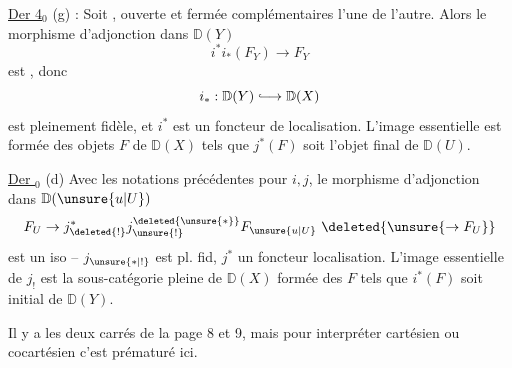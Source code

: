 \uline{Der 4}$_0$ (g) : Soit
,  ouverte et fermée complémentaires l'une de l'autre. Alors le morphisme d'adjonction dans $\mathbb D(Y)$
\[
 i^*i_*(F_Y)\longrightarrow F_Y
\]
est  , donc 
\[
 i_*:\mathbb D(Y)\lhook\joinrel\longrightarrow\mathbb D(X)
\]
est pleinement fidèle, et $i^*$ est un foncteur de localisation.  L'image essentielle  est formée des objets $F$ de $\mathbb D(X)$ tels que $j^*(F)$ soit l'objet final de $\mathbb D(U)$.

\uline{Der }$_0$ (d) Avec les notations précédentes pour $i,j$, le morphisme d'adjonction dans $\mathbb D(\unsure{u|U})$
\[
 F_U\to j_{\deleted{!}}^*j_{\unsure{!}}^{\deleted{\unsure{*}}}F_{\unsure{u|U}}\ \deleted{\unsure{\to F_U}}
\]
est un iso -- $j_{\unsure{*|!}}$ est pl. fid, $j^*$ un foncteur localisation. L'image essentielle de $j_!$ est la sous-catégorie pleine de $\mathbb D(X)$ formée des $F$  tels que $i^*(F)$ soit  initial  de $\mathbb D(Y)$.

Il y a les deux carrés de la page 8 et 9, mais pour interpréter   cartésien ou cocartésien c'est prématuré ici.
